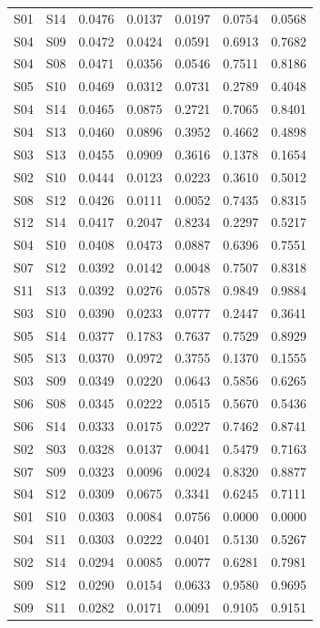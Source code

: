 \begin{table}
\begin{tabular}{llrrrrr}
S01 & S14 & 0.0476 & 0.0137 & 0.0197 & 0.0754 & 0.0568 \\
S04 & S09 & 0.0472 & 0.0424 & 0.0591 & 0.6913 & 0.7682 \\
S04 & S08 & 0.0471 & 0.0356 & 0.0546 & 0.7511 & 0.8186 \\
S05 & S10 & 0.0469 & 0.0312 & 0.0731 & 0.2789 & 0.4048 \\
S04 & S14 & 0.0465 & 0.0875 & 0.2721 & 0.7065 & 0.8401 \\
S04 & S13 & 0.0460 & 0.0896 & 0.3952 & 0.4662 & 0.4898 \\
S03 & S13 & 0.0455 & 0.0909 & 0.3616 & 0.1378 & 0.1654 \\
S02 & S10 & 0.0444 & 0.0123 & 0.0223 & 0.3610 & 0.5012 \\
S08 & S12 & 0.0426 & 0.0111 & 0.0052 & 0.7435 & 0.8315 \\
S12 & S14 & 0.0417 & 0.2047 & 0.8234 & 0.2297 & 0.5217 \\
S04 & S10 & 0.0408 & 0.0473 & 0.0887 & 0.6396 & 0.7551 \\
S07 & S12 & 0.0392 & 0.0142 & 0.0048 & 0.7507 & 0.8318 \\
S11 & S13 & 0.0392 & 0.0276 & 0.0578 & 0.9849 & 0.9884 \\
S03 & S10 & 0.0390 & 0.0233 & 0.0777 & 0.2447 & 0.3641 \\
S05 & S14 & 0.0377 & 0.1783 & 0.7637 & 0.7529 & 0.8929 \\
S05 & S13 & 0.0370 & 0.0972 & 0.3755 & 0.1370 & 0.1555 \\
S03 & S09 & 0.0349 & 0.0220 & 0.0643 & 0.5856 & 0.6265 \\
S06 & S08 & 0.0345 & 0.0222 & 0.0515 & 0.5670 & 0.5436 \\
S06 & S14 & 0.0333 & 0.0175 & 0.0227 & 0.7462 & 0.8741 \\
S02 & S03 & 0.0328 & 0.0137 & 0.0041 & 0.5479 & 0.7163 \\
S07 & S09 & 0.0323 & 0.0096 & 0.0024 & 0.8320 & 0.8877 \\
S04 & S12 & 0.0309 & 0.0675 & 0.3341 & 0.6245 & 0.7111 \\
S01 & S10 & 0.0303 & 0.0084 & 0.0756 & 0.0000 & 0.0000 \\
S04 & S11 & 0.0303 & 0.0222 & 0.0401 & 0.5130 & 0.5267 \\
S02 & S14 & 0.0294 & 0.0085 & 0.0077 & 0.6281 & 0.7981 \\
S09 & S12 & 0.0290 & 0.0154 & 0.0633 & 0.9580 & 0.9695 \\
S09 & S11 & 0.0282 & 0.0171 & 0.0091 & 0.9105 & 0.9151 \\

\end{tabular}
\end{table}
